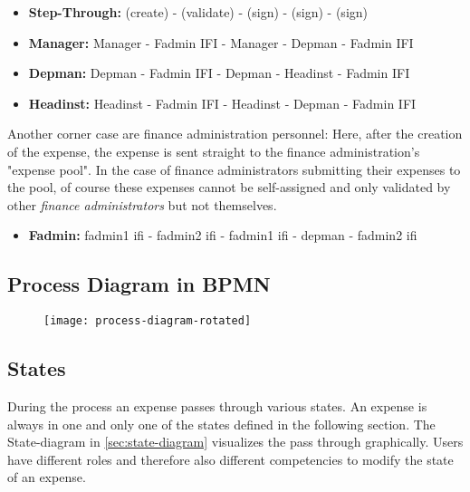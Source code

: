 	\begin{itemize}
		\item \textbf{Step-Through:} (create) - (validate) - (sign) - (sign) - (sign)
		\item \textbf{Manager:} Manager - Fadmin IFI - Manager - Depman - Fadmin IFI
		\item \textbf{Depman:} Depman - Fadmin IFI - Depman - Headinst  - Fadmin IFI
		\item \textbf{Headinst:} Headinst - Fadmin IFI - Headinst - Depman - Fadmin IFI	
	\end{itemize}
	
Another corner case are finance administration personnel: Here, after the creation of the expense, the expense is sent straight to the finance administration's "expense pool". In the case of finance administrators submitting their expenses to the pool, of course these expenses cannot be self-assigned and only validated by other \textit{finance administrators} but not themselves.

\begin{itemize}
	\item \textbf{Fadmin:} fadmin1 ifi - fadmin2 ifi - fadmin1 ifi - depman - fadmin2 ifi
\end{itemize}


\newpage
\subsection{Process Diagram in BPMN}
\label{sec:process-diagram-rotated}
	\begin{figure}[H]
		{\texttt{[image: process-diagram-rotated]}}
	\end{figure}
\newpage

\subsection{States}
\label{sec:states}
During the process an expense passes through various states. An expense is always in one and only one of the states defined in the following section. The State-diagram in \ref{sec:state-diagram} visualizes the pass through graphically. Users have different roles and therefore also different competencies to modify the state of an expense.

